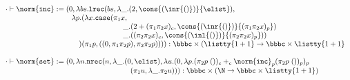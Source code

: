 $$
\begin{array}{l}
\cdot \vdash \norm{\texttt{inc}} := (0,\lambda bs. \texttt{lrec}(bs,\lambda\_. (2,\cons {(\inr {()})} {\elist}),\\
\hspace{9em} \lambda p. (\lambda x. \texttt{case}(\pi_1 x,\\
    \hspace{16em}\_. {(2 + (\pi_1 \pi_2 x)_c,\cons {(\inr {()})} {(\pi_1\pi_2 x)_p})} \\
    \hspace{16em}\_. {((\pi_2\pi_2 x)_c,\cons {(\inl {()})} {(\pi_2\pi_2 x)_p})})\\
 \hspace{10em})(\pi_1 p, ((0,\pi_1 \pi_2 p),\pi_2 \pi_2 p)))) : \bbbc \times (\listty{1 + 1} \to \bbbc \times \listty{1 + 1}
\\\\
\cdot \vdash \norm{\texttt{set}} := (0,\lambda n. \texttt{nrec}(n,\lambda \_. (0,\elist),\lambda u.
{(0,\lambda p. (\pi_2 p \; ())_c +_c \norm{\texttt{inc}}_p (\pi_2 p \; ())_p)_p}\\
\hspace{17em}(\pi_1 u,\lambda \_. \pi_2 u)
)) : \bbbc \times (\N \to \bbbc \times \listty{1 + 1})
\end{array}
$$

